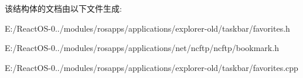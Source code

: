 该结构体的文档由以下文件生成\+:\begin{DoxyCompactItemize}
\item 
E\+:/\+React\+O\+S-\/0../modules/rosapps/applications/explorer-\/old/taskbar/favorites.\+h\item 
E\+:/\+React\+O\+S-\/0../modules/rosapps/applications/net/ncftp/ncftp/bookmark.\+h\item 
E\+:/\+React\+O\+S-\/0../modules/rosapps/applications/explorer-\/old/taskbar/favorites.\+cpp\end{DoxyCompactItemize}
